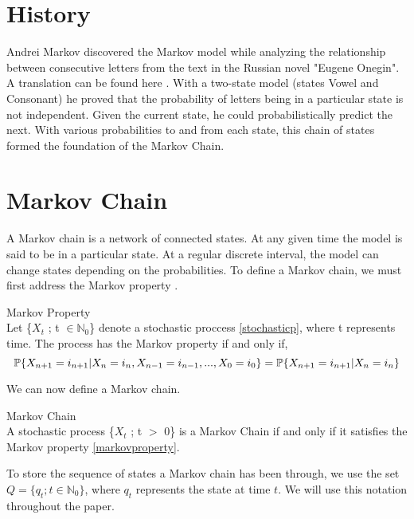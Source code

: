 \section{History}
Andrei Markov discovered the Markov model while analyzing the relationship between consecutive letters from the text in the Russian novel "Eugene Onegin". A translation can be found here \cite{markov2006example}. With a two-state model (states Vowel and Consonant) he proved that the probability of letters being in a particular state is not independent. Given the current state, he could probabilistically predict the next. With various probabilities to and from each state, this chain of states formed the foundation of the Markov Chain.

\section{Markov Chain}
A Markov chain is a network of connected states. At any given time the model is said to be in a particular state. At a regular discrete interval, the model can change states depending on the probabilities. To define a Markov chain, we must first address the Markov property \cite{grimmett2020probability}.

\begin{definition}
\label{markovproperty}
    Markov Property \\
    Let \{$X_t$ ; t $\in \mathbb{N}_0$\} denote a stochastic proccess \ref{stochasticp}, where t represents time. The process has the Markov property if and only if,
    \begin{equation}
        \mathbb{P} \{X_{n+1} = i_{n+1} | X_n = i_n, X_{n-1} = i_{n-1},...,X_0 = i_0\} = \mathbb{P} \{X_{n+1} = i_{n+1} | X_n = i_n\}
    \end{equation}
\end{definition}


We can now define a Markov chain.

\begin{definition}
\label{markovchain}
    Markov Chain \\
    A stochastic process \{$X_t$ ; t $>$ 0\} is a Markov Chain if and only if it satisfies the Markov property \ref{markovproperty}.
\end{definition}

To store the sequence of states a Markov chain has been through, we use the set $Q = \{q_t ; t \in \mathbb{N}_0\}$, where $q_t$ represents the state at time $t$. We will use this notation throughout the paper.

